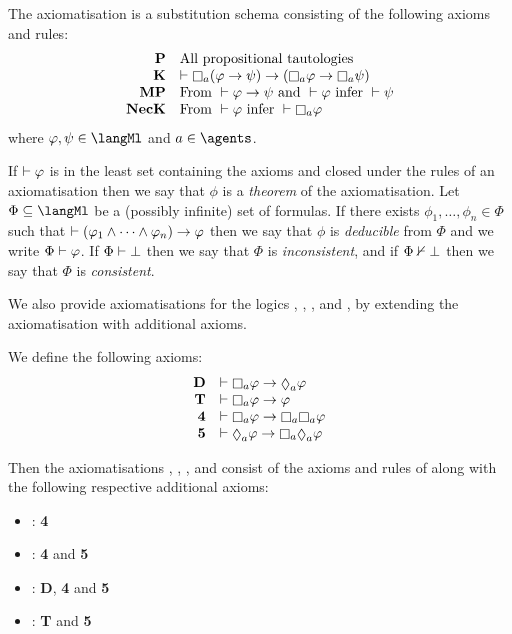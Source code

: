 \begin{definition}
The axiomatisation \axiomK{} is a substitution schema consisting of the following axioms and rules:
$$
\begin{array}{rl}
    {\bf P}     & \text{All propositional tautologies}\\
    {\bf K}     & \proves \necessaryA (\phi \implies \psi) \implies (\necessaryA \phi \implies \necessaryA \psi)\\
    {\bf MP}    & \text{From } \proves \phi \implies \psi \text{ and } \proves \phi \text{ infer } \proves \psi\\
    {\bf NecK}  & \text{From } \proves \phi \text{ infer } \proves \necessaryA \phi
\end{array}
$$
where $\phi, \psi \in \langMl$ and $\agentA \in \agents$.
\end{definition}

If $\vdash \varphi$ is in the least set containing the axioms and closed under the rules of an axiomatisation then we say that $\phi$ is a {\em theorem} of the axiomatisation.
Let $\Phi \subseteq \langMl$ be a (possibly infinite) set of formulas.
If there exists $\phi_1, \dots, \phi_n \in \Phi$ such that $\vdash (\varphi_1 \land \cdots \land \varphi_n) \rightarrow \varphi$ then we say that $\phi$ is {\em deducible} from $\Phi$ and we write $\Phi \vdash \varphi$.
If $\Phi \vdash \bot$ then we say that $\Phi$ is {\em inconsistent}, and if $\Phi \nvdash \bot$ then we say that $\Phi$ is {\em consistent}.

We also provide axiomatisations for the logics \logicKF{}, \logicKFF{}, \logicKD{}, and \logicS{}, by extending the axiomatisation \axiomK{} with additional axioms.

\begin{definition}
We define the following axioms:
$$
\begin{array}{rl}
    {\bf D}     & \proves \necessaryA \phi \implies \possibleA \phi\\
    {\bf T}     & \proves \necessaryA \phi \implies \phi\\
    {\bf 4}     & \proves \necessaryA \phi \implies \necessaryA \necessaryA \phi\\
    {\bf 5}     & \proves \possibleA \phi \implies \necessaryA \possibleA \phi
\end{array}
$$

\pagebreak

Then the axiomatisations \axiomKF{}, \axiomKFF{}, \axiomKD{}, and \axiomS{} consist of the axioms and rules of \axiomK{} along with the following respective additional axioms:
\begin{itemize}
    \item \axiomKF{}: {\bf 4}
    \item \axiomKFF{}: {\bf 4} and {\bf 5}
    \item \axiomKD{}: {\bf D}, {\bf 4} and {\bf 5}
    \item \axiomS{}: {\bf T} and {\bf 5}
\end{itemize}
\end{definition}


